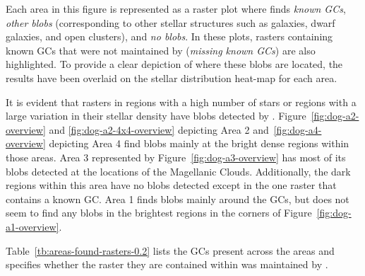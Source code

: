 Each area in this figure is represented as a raster plot where \blobdog{} finds \textit{known GCs}, \textit{other blobs} (corresponding to other stellar structures such as galaxies, dwarf galaxies, and open clusters), and \textit{no blobs}. In these plots, rasters containing known GCs that were not maintained by \blobdog{} (\textit{missing known GCs}) are also highlighted. To provide a clear depiction of where these blobs are located, the results have been overlaid on the stellar distribution heat-map for each area.

It is evident that rasters in regions with a high number of stars or regions with a large variation in their stellar density have blobs detected by \blobdog{}. Figure~\ref{fig:dog-a2-overview} and \ref{fig:dog-a2-4x4-overview} depicting Area 2 and~\ref{fig:dog-a4-overview} depicting Area 4 find blobs mainly at the bright dense regions within those areas. Area 3 represented by Figure~\ref{fig:dog-a3-overview} has most of its blobs detected at the locations of the Magellanic Clouds. Additionally, the dark regions within this area have no blobs detected except in the one raster that contains a known GC. Area 1 finds blobs mainly around the GCs, but does not seem to find any blobs in the brightest regions in the corners of Figure~\ref{fig:dog-a1-overview}.

Table~\ref{tb:areas-found-rasters-0.2} lists the GCs present across the areas and specifies whether the raster they are contained within was maintained by \blobdog{}.

